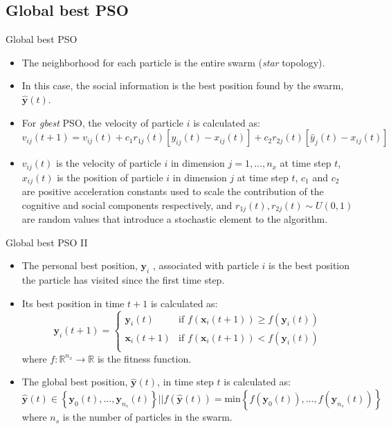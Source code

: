 \documentclass[aspectratio=169,compress,10pt]{beamer}
\begin{document}
\subsection{Global best PSO}
\begin{frame}{Global best PSO}
\begin{itemize}
	\item The neighborhood for each particle is the entire swarm (\emph{star} topology).
	\item In this case, the social information is the best position found by the swarm, $\mathbf{\hat{y}}(t)$.
	\item For \emph{gbest} PSO, the velocity of particle $i$ is calculated as:
	\begin{equation}
	v_{ij}(t+1) = v_{ij}(t) + c_1r_{1j}(t)[y_{ij}(t) - x_{ij}(t)] + c_2 r_{2j}(t)[\hat{y}_j(t) - x_{ij}(t)]
	\label{eq:velocidad-gbest}
	\end{equation}
	
	\item $v_{ij}(t)$ is the velocity of particle $i$ in dimension $j=1,\ldots,n_x$ at time step $t$, $x_{ij}(t)$ is the position of particle $i$ in dimension $j$ at time step $t$, $c_1$ and $c_2$ are positive acceleration constants used to scale the contribution of the cognitive and social components respectively, and $r_{1j}(t), r_{2j}(t) \sim U(0,1)$ are random values that introduce a stochastic element to the algorithm.
\end{itemize}
\end{frame}

\begin{frame}{Global best PSO II}
\begin{itemize}
	\item The personal best position, $\mathbf{y}_i$ , associated with particle $i$ is the best position the particle has visited since the first time step.
	\item Its best position in time $t+1$ is calculated as:
	\begin{equation}
\mathbf{y}_i(t+1) = \begin{cases}
               \mathbf{y}_i(t)	& \text{if } f(\mathbf{x}_i(t+1)) \geq f(\mathbf{y}_i(t))\\
               \mathbf{x}_i(t+1)	& \text{if } f(\mathbf{x}_i(t+1)) < f(\mathbf{y}_i(t))\\
           \end{cases}	
\end{equation}
where $f: \mathbb{R}^{n_x} \to \mathbb{R}$ is the fitness function.
\item The global best position, $\mathbf{\hat{y}}(t)$, in time step $t$ is calculated as:
$$
\mathbf{\hat{y}}(t) \in \left \{ \mathbf{y}_0(t), \ldots, \mathbf{y}_{n_s}(t) \right \} | | f(\mathbf{\hat{y}}(t)) = \text{min} \left \{ f(\mathbf{y}_0(t)),\ldots,f(\mathbf{y}_{n_s}(t)) \right \}
$$
where $n_s$ is the number of particles in the swarm.
\end{itemize}
\end{frame}
\end{document}
